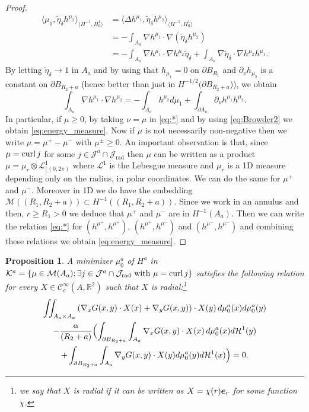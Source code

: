 \documentclass[12pt,reqno]{amsart}
\newtheorem{proposition}[theorem]{Proposition}
\def\C{{\mathcal C}}
\def\M{{\mathcal M}}
\renewcommand{\vec}[1]{\text{\boldmath $#1$}}
\def\curl{{\rm curl\,}}
\def \p {\partial}
\def \J {{\mathcal J}}
\newcommand{\R}{\mathbb{R}}
\numberwithin{equation}{section}
\begin{document}
\begin{proof}
\begin{align*}
\langle \mu_1, \tilde{\eta}_\delta h^{\mu_2} \rangle_{\langle {H^{-1},H^1_0}\rangle} &= \langle \Delta h^{\mu_1}, \tilde{\eta}_\delta h^{\mu_2} \rangle_{\langle {H^{-1},H^1_0}\rangle}\\
&=-\int_{A_a}\nabla h^{\mu_1} \cdot \nabla (\tilde{\eta}_\delta h^{\mu_2}) \\
&=-\int_{A_a}\nabla h^{\mu_1} \cdot \nabla h^{\mu_2} \tilde{\eta}_\delta+\int_{A_a} \nabla \tilde{\eta}_\delta\cdot \nabla h^{\mu_2} h^{\mu_1}.
\end{align*}
By letting \(\tilde{\eta}_\delta \to 1\) in \(A_a\) and by using that \(h_{\mu_1}=0\) on \(\p B_{R_1}\) and \(\p_\nu h_{\mu_2}\) is a constant on \(\p B_{R_2+a}\) (hence better than just in \(H^{-1/2}(\p B_{R_2+a}\))),  we obtain
\begin{equation}\label{eq:*}
\int_{A_a}\nabla h^{\mu_1} \cdot \nabla h^{\mu_2}=-\int_{A_a}h^{\mu_2} d \mu_1 +\int_{ \p A_a}\p_\nu h^{\mu_1} h^{\mu_2}.
\end{equation}
In particular, if \(\mu \geq 0\), by taking \(\nu=\mu\) in \eqref{eq:*} and by using \eqref{eq:Browder2} we obtain \eqref{eq:energy_measure}. Now if \(\mu\) is not necessarily non-negative then we write \(\mu=\mu^+-\mu^-\) with \(\mu^{\pm}\geq 0\). An important observation is that, since \(\mu=\curl j\) for some \(j \in \J^a\cap \J_{\text{rad}}\) then \(\mu\) can be written as a product \(\mu=\mu_r \otimes \mathcal{L}^1_{\lfloor (0,2\pi)}\) where \(\mathcal{L}^1\) is the Lebesgue measure and \(\mu_r\) is a 1D measure depending only on the radius, in polar coordinates. We can do the same for \(\mu^+\) and \(\mu^-\). Moreover in 1D we do have the embedding \(\M( (R_1,R_2+a)) \subset H^{-1}((R_1,R_2+a))\). Since we work in an annulus and then, \(r\geq R_1>0\) we deduce that \(\mu^+\) and \(\mu^-\) are in \(H^{-1}(A_a)\). Then we can write the relation \eqref{eq:*} for \((h^{\mu^+},h^{\mu^+}) \), \((h^{\mu^+},h^{\mu^-})\) and \((h^{\mu^-},h^{\mu^-})\) and combining these relations we obtain \eqref{eq:energy_measure}.
\end{proof}




\begin{proposition}\label{prop:Inner_variations_mu}
A minimizer \(\mu_0^a\) of \(H^a\) in \(\mathcal{K}^a=\{\mu \in \M(A_a); \exists j\in \J^a\cap \J_{\text{rad}} \text{ with } \mu=\curl j\}\) satisfies the following relation for every \(X\in \C^\infty_c(A,\R^2)\) such that \(X\) is radial:\footnote{we say that \(X\) is radial if it can be written as \(X=\chi(r) \vec e_r\) for some function \(\chi\).}
\begin{multline}\label{eq:inner_equal_zero}
\iint_{A_a\times A_a} \left(\nabla _x G(x,y)\cdot X(x) + \nabla _y G(x,y)\right) \cdot X(y) \, d\mu_0^a(x)d\mu_0^a(y) \\
-\frac{\alpha}{(R_2+a)} \Bigl( \int_{\p B_{R_2+a}} \int_{A_a} \nabla_x G(x,y)\cdot X(x) \, d\mu_0^a(x) d\mathcal{H}^1(y) \\
+ \int_{\p B_{R_2+a}} \int_{A_a} \nabla _y G(x,y)\cdot X(y) d\mu_0^a(y) d\mathcal{H}^1(x)\Bigr)=0.
\end{multline}
\end{proposition}
\end{document}
